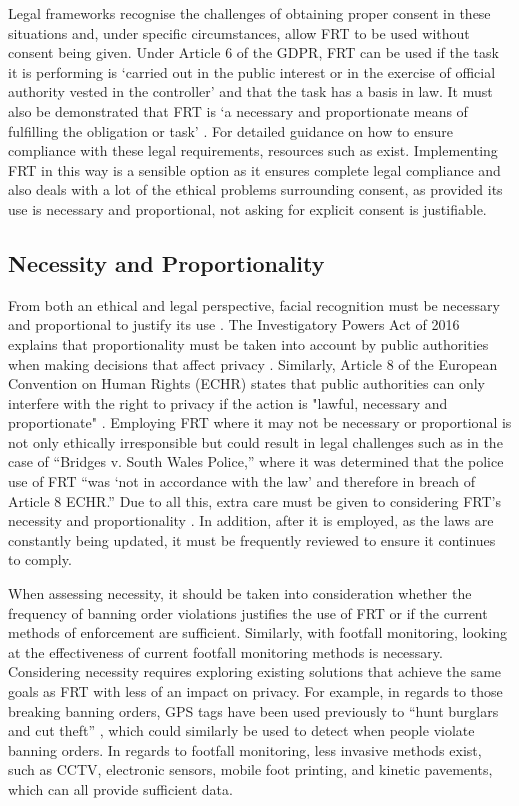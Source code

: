 \documentclass{article}
\begin{document}
Legal frameworks recognise the challenges of obtaining proper consent in these situations and, under specific circumstances, allow FRT to be used without consent being given. Under Article 6 of the GDPR, FRT can be used if the task it is performing is ‘carried out in the public interest or in the exercise of official authority vested in the controller’ and that the task has a basis in law. It must also be demonstrated that FRT is ‘a necessary and
proportionate means of fulfilling the obligation or task’ \cite{IOC_LiveFRT}. For detailed guidance on how to ensure compliance with these legal requirements, resources such as \cite{IOC_LiveFRT} exist. Implementing FRT in this way is a sensible option as it ensures complete legal compliance and also deals with a lot of the ethical problems surrounding consent, as provided its use is necessary and proportional, not asking for explicit consent is justifiable.

\subsection{Necessity and Proportionality}
From both an ethical and legal perspective, facial recognition must be necessary and proportional to justify its use \cite{SurveillanceDelusionOxford}. The Investigatory Powers Act of 2016 explains that proportionality must be taken into account by public authorities when making decisions that affect privacy \cite{Investigatory_Powers_Act}. Similarly, Article 8 of the European Convention on Human Rights (ECHR) states that public authorities can only interfere with the right to privacy if the action is "lawful, necessary and proportionate" \cite{Article8}. Employing FRT where it may not be necessary or proportional is not only ethically irresponsible but could result in legal challenges such as in the case of “Bridges v. South Wales Police,” where it was determined that the police use of FRT “was ‘not in accordance with the law’ and therefore in breach of Article 8 ECHR.” Due to all this, extra care must be given to considering FRT's necessity and proportionality \cite{Loideain_2024}. In addition, after it is employed, as the laws are constantly being updated, it must be frequently reviewed to ensure it continues to comply.

When assessing necessity, it should be taken into consideration whether the frequency of banning order violations justifies the use of FRT or if the current methods of enforcement are sufficient. Similarly, with footfall monitoring, looking at the effectiveness of current footfall monitoring methods is necessary. Considering necessity requires exploring existing solutions that achieve the same goals as FRT with less of an impact on privacy. For example, in regards to those breaking banning orders, GPS tags have been used previously to “hunt burglars and cut theft” \cite{GPS_Tags}, which could similarly be used to detect when people violate banning orders. In regards to footfall monitoring, less invasive methods exist, such as CCTV, electronic sensors, mobile foot printing, and kinetic pavements, which can all provide sufficient data. 
\end{document}
